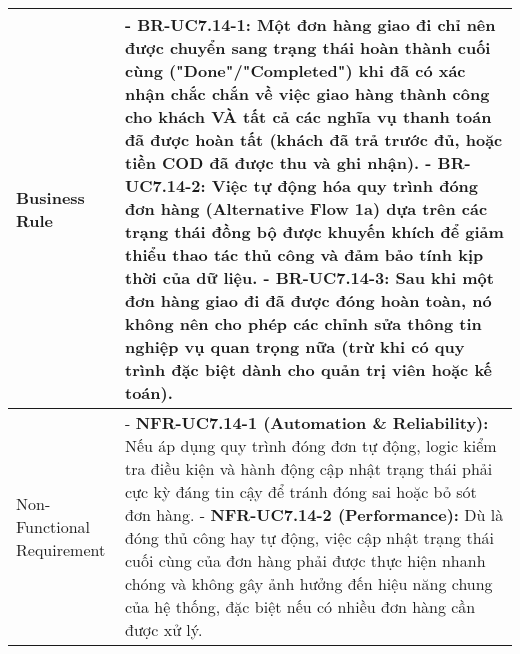 \begin{longtable}{|m{4cm}|p{11cm}|}
\hline
Business Rule & - \textbf{BR-UC7.14-1:} Một đơn hàng giao đi chỉ nên được chuyển sang trạng thái hoàn thành cuối cùng ("Done"/"Completed") khi đã có xác nhận chắc chắn về việc giao hàng thành công cho khách VÀ tất cả các nghĩa vụ thanh toán đã được hoàn tất (khách đã trả trước đủ, hoặc tiền COD đã được thu và ghi nhận). \newline - \textbf{BR-UC7.14-2:} Việc tự động hóa quy trình đóng đơn hàng (Alternative Flow 1a) dựa trên các trạng thái đồng bộ được khuyến khích để giảm thiểu thao tác thủ công và đảm bảo tính kịp thời của dữ liệu. \newline - \textbf{BR-UC7.14-3:} Sau khi một đơn hàng giao đi đã được đóng hoàn toàn, nó không nên cho phép các chỉnh sửa thông tin nghiệp vụ quan trọng nữa (trừ khi có quy trình đặc biệt dành cho quản trị viên hoặc kế toán). \\
\hline
Non-Functional Requirement & - \textbf{NFR-UC7.14-1 (Automation \& Reliability):} Nếu áp dụng quy trình đóng đơn tự động, logic kiểm tra điều kiện và hành động cập nhật trạng thái phải cực kỳ đáng tin cậy để tránh đóng sai hoặc bỏ sót đơn hàng. \newline - \textbf{NFR-UC7.14-2 (Performance):} Dù là đóng thủ công hay tự động, việc cập nhật trạng thái cuối cùng của đơn hàng phải được thực hiện nhanh chóng và không gây ảnh hưởng đến hiệu năng chung của hệ thống, đặc biệt nếu có nhiều đơn hàng cần được xử lý. \\
\hline
\end{longtable}

